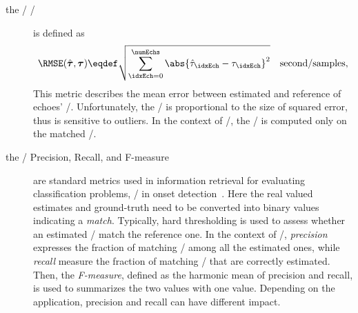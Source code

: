 \begin{description}
    \item[the \TOAs/ \RMSEtxt/] is defined as
    \begin{equation}
        \RMSE(\hat{\boldsymbol{\tau}}, \boldsymbol{\tau}) \eqdef \sqrt{\sum_{\idxEch=0}^{\numEchs} \abs{\hat{\tau}_\idxEch - \tau_\idxEch}^2} \quad \text{second/samples}
        ,
    \end{equation}
    This metric describes the mean error between estimated and reference of echoes' \TOAs/.
    Unfortunately, the \RMSEtxt/ is proportional to the size of squared error, thus is sensitive to outliers.
    In the context of \AER/, the \RMSEtxt/ is computed only on the matched \TOAs/.

    \item[the \TOAs/ Precision, Recall, and F-measure] are standard metrics used in information retrieval for evaluating classification problems, \eg/ in onset detection~.
    Here the real valued estimates and ground-truth need to be converted into binary values indicating a \textit{match}.
    Typically, hard thresholding is used to assess whether an estimated \TOAs/ match the reference one.
    In the context of \AER/, \textit{precision} expresses the fraction of matching \TOAs/ among all the estimated ones, while \textit{recall} measure the fraction of matching \TOAs/ that are correctly estimated.
    Then, the \textit{F-measure}, defined as the harmonic mean of precision and recall, is used to summarizes the two values with one value.
    Depending on the application, precision and recall can have different impact.

\end{description}
